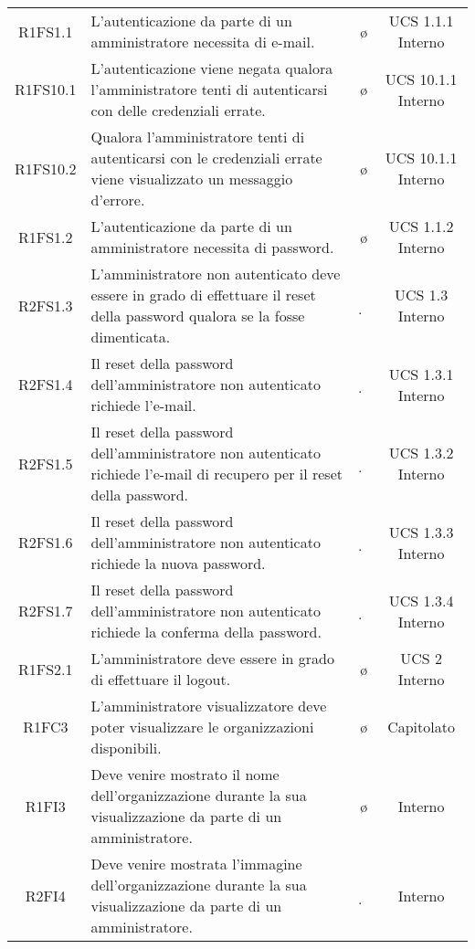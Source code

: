 {\begin{longtable}{ c C{6.5cm} c c}
R1FS1.1 & L’autenticazione da parte di un amministratore necessita di e-mail. & \o & UCS 1.1.1 Interno\\

R1FS10.1 & L’autenticazione viene negata qualora l'amministratore tenti di autenticarsi con delle credenziali errate. & \o & UCS 10.1.1 Interno \\

R1FS10.2 & Qualora l'amministratore tenti di autenticarsi con le credenziali errate viene visualizzato un messaggio d’errore. & \o & UCS 10.1.1 Interno \\

R1FS1.2 & L’autenticazione da parte di un amministratore necessita di password. & \o & UCS 1.1.2 Interno\\

R2FS1.3 & L'amministratore non autenticato deve essere in grado di effettuare il reset della password qualora se la fosse dimenticata. & \d & UCS 1.3 Interno\\

R2FS1.4 & Il reset della password dell'amministratore non autenticato richiede l'e-mail. & \d & UCS 1.3.1 Interno \\

R2FS1.5 & Il reset della password dell'amministratore non autenticato richiede l'e-mail di recupero per il reset della password. & \d & UCS 1.3.2 Interno \\

R2FS1.6 & Il reset della password dell'amministratore non autenticato richiede la nuova password. & \d & UCS 1.3.3 Interno \\

R2FS1.7 & Il reset della password dell'amministratore non autenticato richiede la conferma della password. & \d & UCS 1.3.4 Interno \\

R1FS2.1 & L'amministratore deve essere in grado di effettuare il logout. & \o & UCS 2 Interno\\

R1FC3 & L'amministratore visualizzatore deve poter visualizzare le organizzazioni disponibili. & \o & Capitolato\\

R1FI3 & Deve venire mostrato il nome dell'organizzazione durante la sua visualizzazione da parte di un amministratore. & \o & Interno\\

R2FI4 & Deve venire mostrata l'immagine dell'organizzazione durante la sua visualizzazione da parte di un amministratore. & \d & Interno\\


\end{longtable}}
